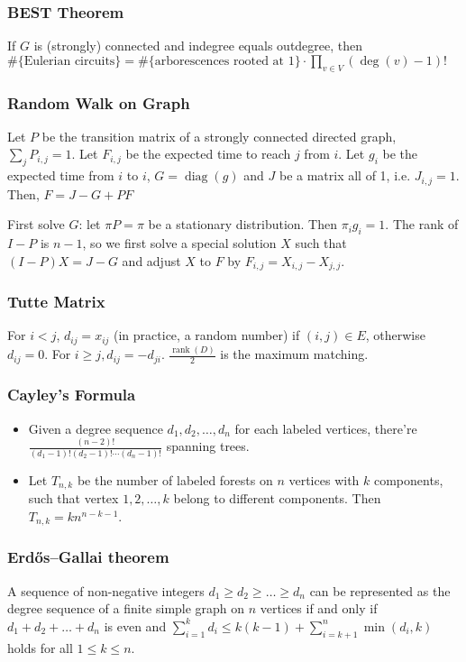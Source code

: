 \subsubsection{BEST Theorem}
If $G$ is (strongly) connected and indegree equals outdegree, then
$
\text{\#\{Eulerian circuits\}} =
  \text{\#\{arborescences rooted at 1\}} \cdot
   \prod _ {v \in V} (\deg(v) - 1)!
$

\subsubsection{Random Walk on Graph}
Let $P$ be the transition matrix of a strongly connected directed graph, $\sum _ j P_{i,j} = 1$.
Let $F_{i,j}$ be the expected time to reach $j$ from $i$.
Let $g_i$ be the expected time from $i$ to $i$, $G = \operatorname{diag}(g)$
and $J$ be a matrix all of 1, i.e. $J_{i,j} = 1$.
Then, $F = J - G + PF$

\noindent
First solve $G$: let $\pi P = \pi$ be a stationary distribution. Then $\pi_i g_i = 1$.
The rank of $I - P$ is $n - 1$, so we first solve a special solution $X$ such that $(I - P)X = J - G$ and adjust $X$ to $F$ by
$F_{i,j} = X_{i,j} - X_{j,j}$.

\subsubsection{Tutte Matrix}
For $i < j$, $d_{ij} = x_{ij}$ (in practice, a random number) if $(i, j) \in E$, otherwise $d_{ij} = 0$.
For $i \geq j, d_{ij} = -d_{ji}$.
$\frac{\operatorname{rank}(D)}{2}$ is the maximum matching.

\subsubsection{Cayley's Formula}
\begin{itemize}
  \item Given a degree sequence $d_1, d_2, \ldots, d_n$ for each labeled vertices, there're $\frac{(n - 2)!}{(d_1 - 1)!(d_2 - 1)!\cdots(d_n - 1)!}$ spanning trees.
  \item Let $T_{n, k}$ be the number of labeled forests on $n$ vertices with $k$ components, such that vertex $1, 2, \ldots, k$ belong to different components. Then $T_{n, k} = kn^{n - k - 1}$.
\end{itemize}

\subsubsection{Erdős–Gallai theorem}
A sequence of non-negative integers $d_1 \geq d_2 \geq \ldots \geq d_n$ can be represented as the degree sequence of a finite simple graph on $n$ vertices if and only if $d_1 + d_2 + \ldots + d_n$ is even and
$\sum_{i = 1}^{k}d_i \leq k(k - 1) + \sum_{i = k + 1}^{n}\min(d_i, k)$
holds for all $1 \leq k \leq n$.

